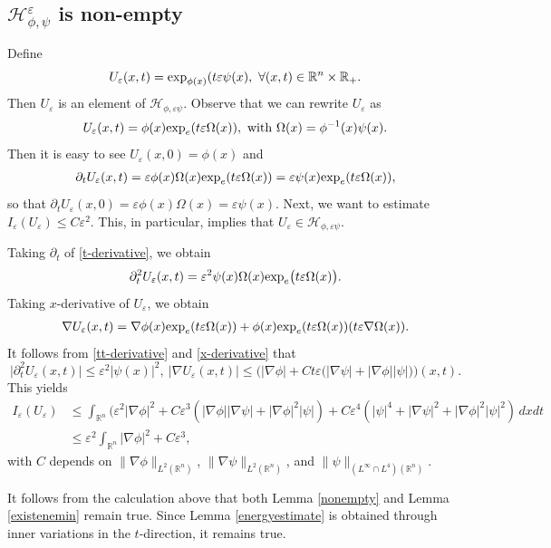\documentclass[12pt,twoside,reqno]{amsart}
\theoremstyle{definition}              %
\theoremstyle{remark}                  %
\newcommand{\R}{\mathbb{R}}                 %
\newcommand{\eps}{\varepsilon}
\renewcommand{\exp}{\textup{exp}}
\renewcommand{\1}{\mathbbm{1}}                                      %
\numberwithin{equation}{section}
\numberwithin{definition}{section}
\numberwithin{theorem}{section}
\numberwithin{remark}{section}
\begin{document}
\subsection{$\mathcal{H}_{\phi,\psi}^\eps$ is non-empty}
Define $$U_\eps(x,t)=\exp_{\phi(x)}(t\eps\psi(x),
\ \forall(x,t)\in \R^n\times\R_+.$$
Then $U_\eps$ is an element of $\mathcal{H}_{\phi,\eps\psi}$.
Observe that we can rewrite $U_\eps$ as
\[
U_\eps(x,t)=\phi(x)\exp_e(t\eps \Omega(x)), \ {\rm{with}}\ 
\Omega(x)=\phi^{-1}(x)\psi(x).
\]
Then it is easy to see $U_\eps(x,0)=\phi(x)$ and
\begin{align}\label{t-derivative}
\partial_t U_\eps(x,t)=\eps\phi(x)\Omega(x) \exp_e(t\eps \Omega(x))
=\eps\psi(x)\exp_e(t\eps \Omega(x)),
\end{align}
so that $\partial_t U_\eps(x,0)=\eps \phi(x)\Omega(x)=\eps\psi(x)$.
Next, we want to estimate $I_\eps(U_\eps)\le C\eps^2$.
This, in particular, implies that $U_\eps\in \mathcal{H}_{\phi,\eps\psi}$.

Taking $\partial_t$ of \eqref{t-derivative}, we obtain
\begin{align}\label{tt-derivative}
\partial_t^2 U_\eps(x,t)=\eps^2\psi(x)\Omega(x)\exp_e\big(t\eps \Omega(x)\big).
\end{align}
Taking $x$-derivative of $U_\eps$, we obtain
\begin{align}\label{x-derivative}
\nabla U_\eps(x,t)
=\nabla\phi(x)\exp_e(t\eps\Omega(x))
+\phi(x)\exp_e(t\eps\Omega(x))(t\eps\nabla\Omega(x)).
\end{align}
It follows from \eqref{tt-derivative} and \eqref{x-derivative}
that
\[
\big|\partial_t^2 U_\eps(x,t)\big|\le \eps^2|\psi(x)|^2,
\ \big|\nabla U_\eps(x,t)\big|\le \Big(|\nabla\phi|+Ct\eps\big(|\nabla\psi|+
|\nabla\phi||\psi|\big)\Big)(x,t).
\]
This yields
\begin{align}\label{energyupbound}
I_\eps(U_\eps)
&\le \int_{\R^n} \big(\eps^2|\nabla\phi|^2
+C\eps^3(|\nabla\phi||\nabla\psi|+|\nabla\phi|^2|\psi|)
+C\eps^4(|\psi|^4+|\nabla\psi|^2+|\nabla\phi|^2|\psi|^2)\,dxdt\nonumber\\
&\le \eps^2\int_{\R^n}|\nabla\phi|^2
+C\eps^3,
\end{align}
with $C$ depends on $\|\nabla\phi\|_{L^2(\R^n)}$, 
$\|\nabla\psi\|_{L^2(\R^n)}$,
and $\|\psi\|_{(L^\infty\cap L^4)(\R^n)}$.

\smallskip
It follows from the calculation above that both Lemma \ref{nonempty} and Lemma \ref{existenemin} remain true. 
Since Lemma \ref{energyestimate} is obtained through inner variations in the $t$-direction, it remains true.
\end{document}
